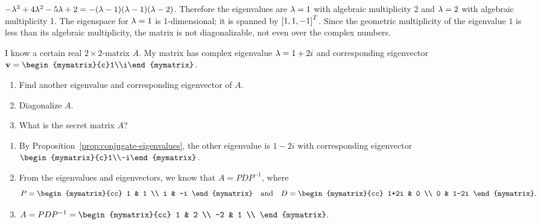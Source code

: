 \begin{ex}
\begin{sol}
\begin{enumerate}
      $-\lambda^3 +4\lambda^2 -5\lambda + 2 =
      -(\lambda-1)(\lambda-1)(\lambda-2)$. Therefore the
      eigenvalues are $\lambda=1$ with algebraic multiplicity 2 and
      $\lambda=2$ with algebraic multiplicity 1. The eigenspace for
      $\lambda=1$ is 1-dimensional; it is spanned by
      $\left[1,1,-1\right]^T$. Since the geometric multiplicity of the
      eigenvalue $1$ is less than its algebraic multiplicity, the
      matrix is not diagonalizable, not even over the complex numbers.
    \end{enumerate}
  \end{sol}
\end{ex}

\begin{ex}
  I know a certain real $2\times 2$-matrix $A$. My matrix has complex
  eigenvalue $\lambda=1+2i$ and corresponding eigenvector
  $\vect{v}=\begin{mymatrix}{c}1\\i\end{mymatrix}$.
  \begin{enumerate}
  \item Find another eigenvalue and corresponding eigenvector of $A$.
  \item Diagonalize $A$.
  \item What is the secret matrix $A$?
  \end{enumerate}

  \begin{sol}
    \begin{enumerate}
    \item By Proposition~\ref{prop:conjugate-eigenvalues}, the other
      eigenvalue is $1-2i$ with corresponding eigenvector
      $\begin{mymatrix}{c}1\\-i\end{mymatrix}$.
    \item From the eigenvalues and eigenvectors, we know that
      $A=PDP^{-1}$, where
      \begin{equation*}
        P = \begin{mymatrix}{cc}
          1 & 1 \\
          i & -i
        \end{mymatrix}
        \quad\mbox{and}\quad
        D = \begin{mymatrix}{cc}
          1+2i & 0 \\
          0 & 1-2i
        \end{mymatrix}.
      \end{equation*}
    \item $A = PDP^{-1} = \begin{mymatrix}{cc}
        1 & 2 \\
        -2 & 1 \\
      \end{mymatrix}$.
    \end{enumerate}
  \end{sol}
\end{ex}

